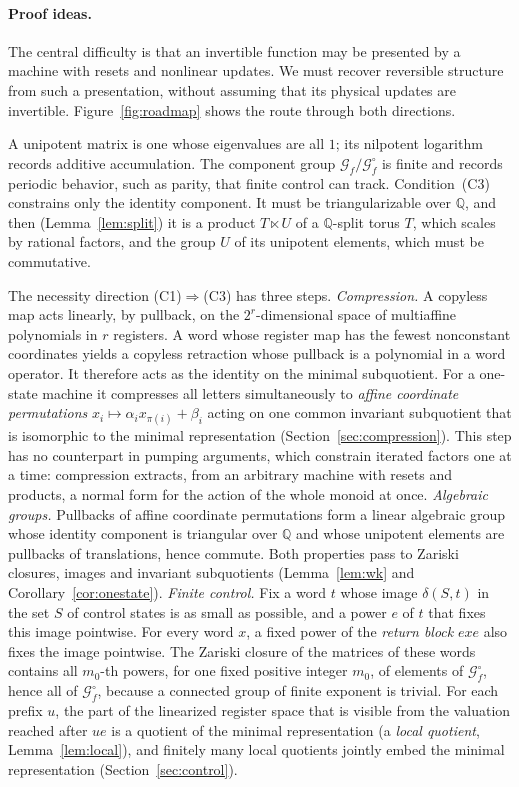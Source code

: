 \documentclass[11pt,letterpaper]{article}
\newcommand{\Q}{\mathbb{Q}}
\newcommand{\cG}{\mathcal{G}}
\theoremstyle{definition}
\begin{document}
\paragraph{Proof ideas.}
The central difficulty is that an invertible function may be presented by a machine with resets and nonlinear updates. We must recover reversible structure from such a presentation, without assuming that its physical updates are invertible. Figure~\ref{fig:roadmap} shows the route through both directions.

A unipotent matrix is one whose eigenvalues are all $1$; its nilpotent logarithm records additive accumulation. The component group $\cG_f/\cG_f^\circ$ is finite and records periodic behavior, such as parity, that finite control can track. Condition~(C3) constrains only the identity component. It must be triangularizable over $\Q$, and then (Lemma~\ref{lem:split}) it is a product $T\ltimes U$ of a $\Q$-split torus $T$, which scales by rational factors, and the group $U$ of its unipotent elements, which must be commutative.

The necessity direction (C1)$\Rightarrow$(C3) has three steps.
\emph{Compression.} A copyless map acts linearly, by pullback, on the $2^r$-dimensional space of multiaffine polynomials in $r$ registers. A word whose register map has the fewest nonconstant coordinates yields a copyless retraction whose pullback is a polynomial in a word operator. It therefore acts as the identity on the minimal subquotient. For a one-state machine it compresses all letters simultaneously to \emph{affine coordinate permutations} $x_i\mapsto\alpha_ix_{\pi(i)}+\beta_i$ acting on one common invariant subquotient that is isomorphic to the minimal representation (Section~\ref{sec:compression}). This step has no counterpart in pumping arguments, which constrain iterated factors one at a time: compression extracts, from an arbitrary machine with resets and products, a normal form for the action of the whole monoid at once.
\emph{Algebraic groups.} Pullbacks of affine coordinate permutations form a linear algebraic group whose identity component is triangular over $\Q$ and whose unipotent elements are pullbacks of translations, hence commute. Both properties pass to Zariski closures, images and invariant subquotients (Lemma~\ref{lem:wk} and Corollary~\ref{cor:onestate}).
\emph{Finite control.} Fix a word $t$ whose image $\delta(S,t)$ in the set $S$ of control states is as small as possible, and a power $e$ of $t$ that fixes this image pointwise. For every word $x$, a fixed power of the \emph{return block} $exe$ also fixes the image pointwise. The Zariski closure of the matrices of these words contains all $m_0$-th powers, for one fixed positive integer $m_0$, of elements of $\cG_f^\circ$, hence all of $\cG_f^\circ$, because a connected group of finite exponent is trivial. For each prefix $u$, the part of the linearized register space that is visible from the valuation reached after $ue$ is a quotient of the minimal representation (a \emph{local quotient}, Lemma~\ref{lem:local}), and finitely many local quotients jointly embed the minimal representation (Section~\ref{sec:control}).
\end{document}
